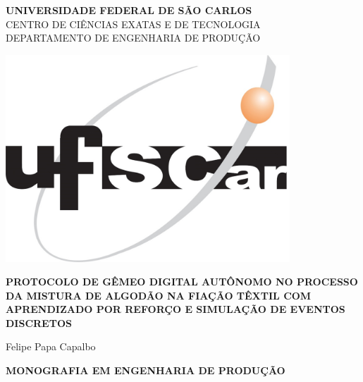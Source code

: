 \documentclass[
    12pt,                %
    openright,           %
    oneside,             %
    a4paper,             %
    english,             %
    spanish,             %
    brazil               %
]{ufscar}
\newcommand{\PROTOCOLO}{PROTOCOLO DE GÊMEO DIGITAL AUTÔNOMO NO PROCESSO DA MISTURA DE ALGODÃO NA FIAÇÃO TÊXTIL COM APRENDIZADO POR REFORÇO E SIMULAÇÃO DE EVENTOS DISCRETOS}
\newcommand{\AUTOR}{Felipe Papa Capalbo}
\begin{document}
\frenchspacing  %



\begin{center}
    {\fontsize{16pt}{16pt}\selectfont \textbf{UNIVERSIDADE FEDERAL DE SÃO CARLOS}}\\[10pt]
    
    {\fontsize{14pt}{14pt}\selectfont CENTRO DE CIÊNCIAS EXATAS E DE TECNOLOGIA}\\[10pt]
    
    {\fontsize{14pt}{14pt}\selectfont DEPARTAMENTO DE ENGENHARIA DE PRODUÇÃO}\\
    
    \vspace*{\fill}
    
    \includegraphics[width=0.8\textwidth]{figures/UFSCar.png}  %
    
    \vspace*{\fill}
    
    {\fontsize{14pt}{14pt}\selectfont \textbf{\PROTOCOLO}}\\
    
    \vspace*{\fill}
    
    {\fontsize{14pt}{14pt}\selectfont \AUTOR}\\
    
    \vspace*{\fill}
    
    {\fontsize{12pt}{12pt}\selectfont \textbf{MONOGRAFIA EM ENGENHARIA DE PRODUÇÃO}}

    \vspace*{\fill}
    
\end{center}
\end{document}
